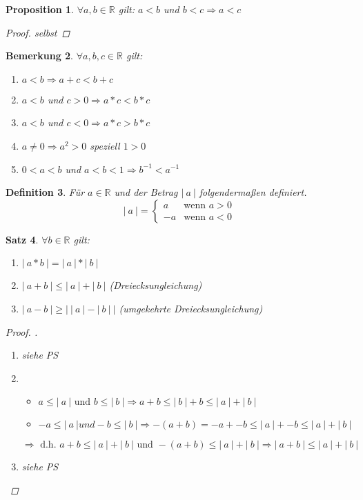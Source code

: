 \documentclass[a4paper,titlepage,oneside]{article}
\def\R{\ensuremath{\mathbb{R}} }
\newcommand{\fain}[2]{\ensuremath{\forall#1\in#2}}
\newcommand{\abs}[1]{\ensuremath{\left|\:#1\:\right|}}
\theoremstyle{thmstyle}
\newtheorem{satz}{Satz}[subsection]
\newtheorem{prop}[satz]{Proposition}
\newtheorem{defi}[satz]{Definition}
\newtheorem{bem}[satz]{Bemerkung}
\begin{document}
\begin{prop}
\fain{a, b}{\R} gilt: $a < b$ und $b < c \Rightarrow a < c$
\begin{proof}
selbst  %
\end{proof}
\end{prop}

\begin{bem}
\fain{a, b, c}{\R} gilt:
\begin{enumerate}[label=\alph*)]
\item $a < b \Rightarrow a + c < b + c$
\item $a < b$ und $c > 0 \Rightarrow a * c < b * c$
\item $a < b$ und $c < 0 \Rightarrow a * c > b * c$
\item $a \ne 0 \Rightarrow a^2 > 0$  speziell $1 > 0$
\item $0 < a < b$ und $a < b < 1 \Rightarrow b^{-1} < a^{-1}$
\end{enumerate}
\end{bem}

\begin{defi}
Für $a \in \R$ und der Betrag \abs{a} folgendermaßen definiert. 
\[\abs{a} = \begin{cases}
 a & \text{wenn } a > 0\\
-a & \text{wenn } a < 0
\end{cases}\]
\end{defi}

\begin{satz}
\fain{ b}{ \R} gilt:
\begin{enumerate}[label=(\arabic*)]
\item $\abs{a * b} = \abs{a} * \abs{b}$
\item $\abs{a + b} \le \abs{a} + \abs{b} $ (Dreiecksungleichung)
\item $\abs{a - b} \ge \abs{\abs{a} - \abs{b}}$ (umgekehrte Dreiecksungleichung)
\end{enumerate}
\begin{proof}.
\begin{enumerate}[label=(\arabic*)]
\item siehe PS
\item 
\begin{itemize}
\item $a \le \abs{a} \text{ und } b \le \abs{b} \Rightarrow a + b \le \abs{b} + b \le \abs{a}+\abs{b} $
\item $-a \le \abs{a} und -b \le \abs{b}  \Rightarrow -(a + b) = -a + -b \le \abs{a} + -b \le \abs{a} +\abs{b}  $
\end{itemize}
$\Rightarrow \text{ d.h. } a + b \le \abs{a} + \abs{b}  \text{ und } -(a + b) \le \abs{a} + \abs{b}  \Rightarrow \abs{a + b} \le \abs{a} + \abs{b} $
\item siehe PS
\end{enumerate}
\end{proof}
\end{satz}
\end{document}
